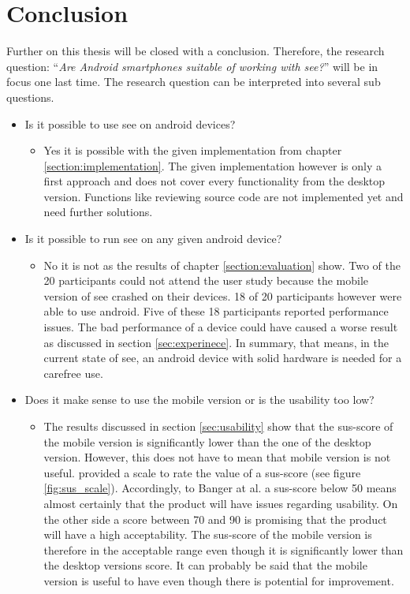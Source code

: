 \section{Conclusion}
\label{section:conclusion}
Further on this thesis will be closed with a conclusion.
Therefore, the research question: \enquote{\textit{Are Android smartphones suitable of working with \gls{see}?}} will be in focus one last time.
The research question can be interpreted into several sub questions. 
\begin{itemize}
    \item Is it possible to use \gls{see} on \gls{android} devices?
    \begin{itemize}
        \item Yes it is possible with the given implementation from chapter \ref{section:implementation}.
        The given implementation however is only a first approach and does not cover every functionality from the desktop version.
        Functions like reviewing source code are not implemented yet and need further solutions. 
    \end{itemize}
    \item Is it possible to run \gls{see} on any given \gls{android} device?
    \begin{itemize}
        \item No it is not as the results of chapter \ref{section:evaluation} show. 
        Two of the 20 participants could not attend the user study because the mobile version of \gls{see} crashed on their devices.
        18 of 20 participants however were able to use \gls{android}. 
        Five of these 18 participants reported performance issues.
        The bad performance of a device could have caused a worse result as discussed in section \ref{sec:experinece}.
        In summary, that means, in the current state of \gls{see}, an \gls{android} device with solid hardware is needed for a carefree use.
    \end{itemize}
    \item Does it make sense to use the mobile version or is the \gls{usability} too low? 
    \begin{itemize}
        \item The results discussed in section \ref{sec:usability} show that the \gls{sus}-score of the mobile version is significantly lower than the one of the desktop version.
        However, this does not have to mean that mobile version is not useful. 
        \cite{doi:10.1080/10447310802205776} provided a scale to rate the value of a \gls{sus}-score (see figure \ref{fig:sus_scale}).
        Accordingly, to Banger at al. a \gls{sus}-score below 50 means almost certainly that the product will have issues regarding \gls{usability}.
        On the other side a score between 70 and 90 is promising that the product will have a high acceptability.
        The \gls{sus}-score of the mobile version is therefore in the acceptable range even though it is significantly lower than the desktop versions score.
        It can probably be said that the mobile version is useful to have even though there is potential for improvement.
    \end{itemize}
\end{itemize}


